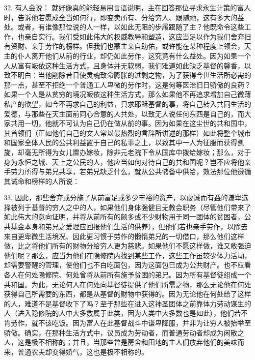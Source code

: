 32. 有人会说： 就好像真的能轻易用言语说明，主在回答那位寻求永生计策的富人时，告诉他若愿成全当如何行，即变卖所有、分给穷人、跟随祂，这有多大的益处。或者，有谁像那位说的人一样，以如此无阻的步履跟随了主？他既命令这些工作，也亲自实行。我们受如此伟大的权威教导和塑造，这应当足以作为我们舍弃旧有资财、亲手劳作的榜样。但我们也蒙主亲自助佑，或许能在某种程度上领会，天主的仆人离开他们从前的行业，却仍如此劳作，这究竟有什么益处。因为如果一个人从富有皈依这种生活方式，且身体并无软弱，我们难道如此缺乏基督的馨香，以致不明白：当他削除昔日使灵魂致命膨胀的过剩之物，为了获得今世生活所必需的那一点，甚至不拒绝一个普通工人卑微的劳作时，这是何等医治旧日骄傲的良药？如果一个人是从贫穷的境况皈依这种生活方式，那么如果他不再追求增加自己微薄私产的欲望，如今不再求自己的利益，只求耶稣基督的事，将自己转入共同生活的爱德，与那些在天主面前同心合意的人共处，以致无人说任何东西是自己的，而大家共用一切，他就不可认为自己仍在做从前的事。因为如果在这尘世的共和国中，其首领们（正如他们自己的文人常以最热烈的言辞所讲述的那样）如此将整个城市和国家全体人民的公共利益置于自己的私事之上，以致其中一人为征服而获得凯旋，却毫无所得为女儿置办嫁妆，除非元老院下令从国库中拨给嫁妆；那么，对于身为永恒之城、天上之公民的人，他应当如何对待自己的共和国呢？岂不应将他亲手劳力所得与弟兄共享，若弟兄缺乏什么，就从公共储备中供给，效法那位他遵循其诫命和榜样的人所说：\par

33. 因此，那些舍弃或分施了从前富足或多少丰裕的资产，以虔诚而有益的谦卑选择被列于基督的穷人之中的人，如果他们身体强健且无教会职务（尽管他们带来了如此伟大的意向证明，并将从前所有的颇多或不少财物用于同一团体的贫困者，公共基金本身和弟兄之爱理应回报他们生活的供养），但他们若也亲手劳作，以除去来自更卑微生活境况、因此更习惯于劳作的懒惰弟兄的一切借口，那么他们这样做，比之将他们所有的财物分给穷人更为慈悲。如果他们不愿这样做，谁又敢强迫他们呢？那么，应当为他们在隐修院内找到某些工作，这些工作虽较少体力活动，却需要警醒的管理，使他们也不白吃面包，因为这面包已成为公共财产。也不应看各人在何处隐修院、何处曾将从前所有施予贫困的弟兄。因为所有基督徒组成一个共和国。为此，无论何人在何处向基督徒提供了他们所需之物，那么无论他在何处获得自己所需要的东西，都是从基督的财物中获得的。因为无论他在何处给了这样的人，难道不是基督收下了吗？至于那些在进入这神圣团体之前靠体力劳动谋生的人（进入隐修院的人中大多数属于此类，因为人类中大多数也是如此），他们若不肯劳作，就不该吃饭。因为富人在此基督战斗中谦卑降服，并非为让穷人被抬举至骄傲。确实，在那种生活方式中，议员成为劳动者，而普通劳动者却成为闲散之人，这是极不相称的；并且，当那些曾是房舍和田地的主人们放弃他们的美味而来，普通农夫却变得娇气，这也是极不相称的。\par

